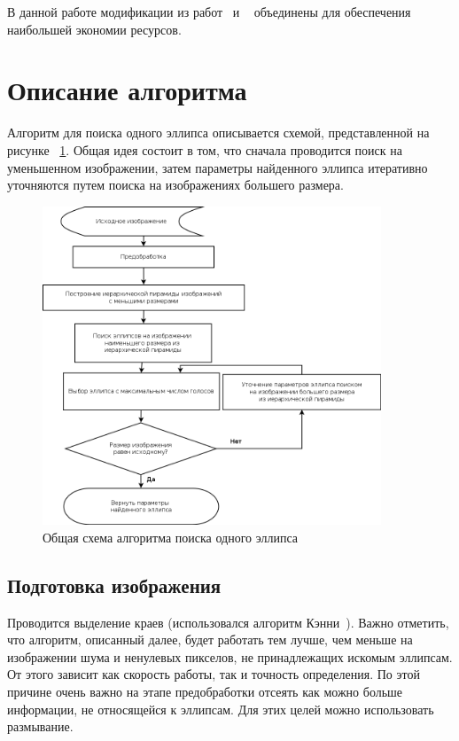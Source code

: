 В данной работе модификации из работ~\autocite{OneDim} и ~\autocite{Chien} объединены для обеспечения наибольшей экономии ресурсов.

\section{Описание алгоритма}
Алгоритм для поиска одного эллипса описывается схемой, представленной на рисунке ~\ref{fig:oneellipse}. 
Общая идея состоит в том, что сначала проводится поиск на уменьшенном изображении, затем параметры найденного эллипса итеративно уточняются путем поиска на изображениях большего размера.
\begin{figure}[H]
\centering
\caption{\label{fig:oneellipse} Общая схема алгоритма поиска одного эллипса}
\includegraphics[width=0.9\textwidth]{img/oneellipse.png}
\end{figure}
\subsection{Подготовка изображения}
Проводится выделение краев (использовался алгоритм Кэнни~\autocite{Canny}). Важно отметить, что алгоритм, описанный далее, будет работать тем лучше, чем меньше на изображении шума и ненулевых пикселов,
не принадлежащих искомым эллипсам. От этого зависит как скорость работы, так и точность определения. 
По этой причине очень важно на этапе предобработки отсеять как можно больше информации, не относящейся к эллипсам. Для этих целей можно использовать размывание.
